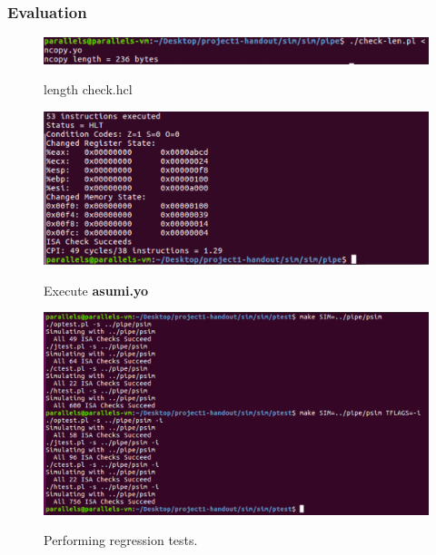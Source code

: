 \documentclass{article}
\begin{document}
\subsubsection{Evaluation}

\begin{figure}[H]
	\begin{minipage}[h]{\textwidth}
		\centering
		\includegraphics[width=1\textwidth]{length_check.png}
		\caption{length check.hcl} \label{Fig-G6}
		\hspace{5mm}
		\includegraphics[width=1\textwidth]{execute_asumi.yo.png}
		\caption{Execute \textbf{asumi.yo}} \label{Fig-G7}
		\hspace{5mm}
		\includegraphics[width=1\textwidth]{regression_tests.png}
		\caption{Performing regression tests.} \label{Fig-G8}
		\hspace{5mm}
	\end{minipage}
\end{figure}
\end{document}
